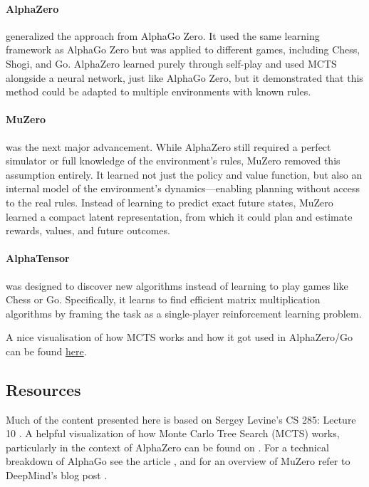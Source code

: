 \paragraph{AlphaZero}  generalized the approach from AlphaGo Zero. It used the same learning framework as AlphaGo Zero but was applied to 
different games, including Chess, Shogi, and Go. AlphaZero learned purely through self-play and used MCTS alongside a neural network, just 
like AlphaGo Zero, but it demonstrated that this method could be adapted to multiple environments with known rules.
\paragraph{MuZero} was the next major advancement. While AlphaZero still required a perfect simulator or full knowledge of the environment's 
rules, MuZero removed this assumption entirely. It learned not just the policy and value function, but also an internal model of the 
environment's dynamics—enabling planning without access to the real rules. Instead of learning to predict exact future states, MuZero learned 
a compact latent representation, from which it could plan and estimate rewards, values, and future outcomes.
\paragraph{AlphaTensor} was designed to discover new algorithms instead of learning to play games like Chess or Go. Specifically, it learns 
to find efficient matrix multiplication algorithms by framing the task as a single-player reinforcement learning problem.


A nice visualisation of how MCTS works and how it got used in AlphaZero/Go can be found \href{http://joshvarty.github.io/AlphaZero/}{here}.

\subsection{Resources}
Much of the content presented here is based on Sergey Levine’s CS 285: Lecture 10 \cite{CS285,CS285LevineYoutube}.
A helpful visualization of how Monte Carlo Tree Search (MCTS) works, particularly in the context of AlphaZero can be 
found on \cite{alphaZero}. For a technical breakdown of AlphaGo see the article \cite{alphaGo}, and for an overview 
of MuZero refer to DeepMind’s blog post \cite{muZero}.
